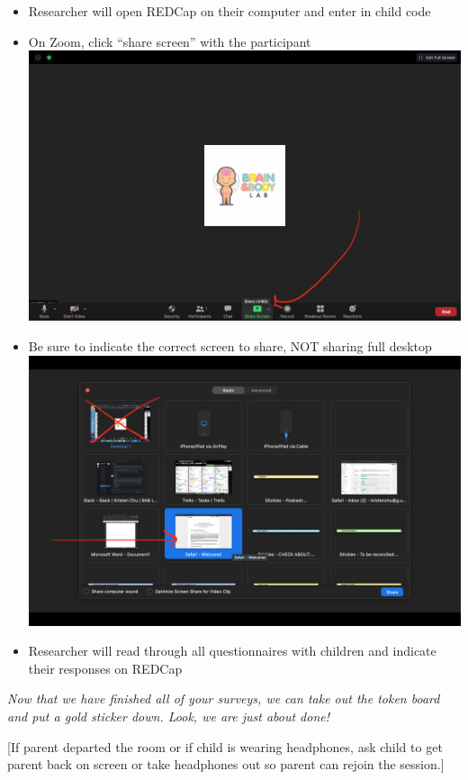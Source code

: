 \documentclass[]{book}
\providecommand{\tightlist}{%
  \setlength{\itemsep}{0pt}\setlength{\parskip}{0pt}}
\begin{document}
\begin{itemize}
\tightlist
\item
  Researcher will open REDCap on their computer and enter in child code
\item
  On Zoom, click ``share screen'' with the participant \includegraphics{images/zoom_screenshare/1.png}
\item
  Be sure to indicate the correct screen to share, NOT sharing full desktop \includegraphics{images/zoom_screenshare/2.png}
\item
  Researcher will read through all questionnaires with children and indicate their responses on REDCap
\end{itemize}

\emph{Now that we have finished all of your surveys, we can take out the token board and put a gold sticker down. Look, we are just about done!}

{[}If parent departed the room or if child is wearing headphones, ask child to get parent back on screen or take headphones out so parent can rejoin the session.{]}
\end{document}
